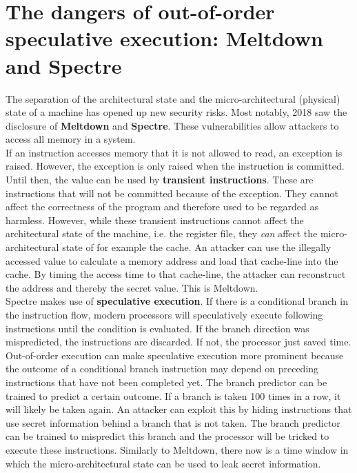 \documentclass[12pt,a4paper]{article} %
\begin{document}
\newpage
\section{The dangers of out-of-order speculative execution: Meltdown and Spectre} \label{sec-oooDangers}
The separation of the architectural state and the micro-architectural (physical) state of a machine has opened up new security risks. Most notably, 2018 saw the disclosure of \textbf{Meltdown} and \textbf{Spectre}. These vulnerabilities allow attackers to access all memory in a system.\\

If an instruction accesses memory that it is not allowed to read, an exception is raised. However, the exception is only raised when the instruction is committed. Until then, the value can be used by \textbf{transient instructions}. These are instructions that will not be committed because of the exception. They cannot affect the correctness of the program and therefore used to be regarded as harmless. However, while these transient instructions cannot affect the architectural state of the machine, i.e. the register file, they \textit{can} affect the micro-architectural state of for example the cache. An attacker can use the illegally accessed value to calculate a memory address and load that cache-line into the cache. By timing the access time to that cache-line, the attacker can reconstruct the address and thereby the secret value. This is Meltdown. \cite{meltdown}\\

Spectre makes use of \textbf{speculative execution}. If there is a conditional branch in the instruction flow, modern processors will speculatively execute following instructions until the condition is evaluated. If the branch direction was mispredicted, the instructions are discarded. If not, the processor just saved time. Out-of-order execution can make speculative execution more prominent because the outcome of a conditional branch instruction may depend on preceding instructions that have not been completed yet. The branch predictor can be trained to predict a certain outcome. If a branch is taken 100 times in a row, it will likely be taken again. An attacker can exploit this by hiding instructions that use secret information behind a branch that is not taken. The branch predictor can be trained to mispredict this branch and the processor will be tricked to execute these instructions. Similarly to Meltdown, there now is a time window in which the micro-architectural state can be used to leak secret information. \cite{spectre}\\
\end{document}
